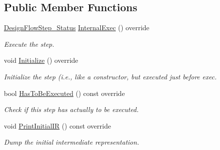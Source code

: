 \subsection*{Public Member Functions}
\begin{DoxyCompactItemize}
\item 
\hyperlink{design__flow__step_8hpp_afb1f0d73069c26076b8d31dbc8ebecdf}{Design\+Flow\+Step\+\_\+\+Status} \hyperlink{classallocation_a4bb8fddc280745e60af6840eec09d4ca}{Internal\+Exec} () override
\begin{DoxyCompactList}\small\item\em Execute the step. \end{DoxyCompactList}\item 
void \hyperlink{classallocation_a448e4e0cc7e3444fb3479f211d0b637e}{Initialize} () override
\begin{DoxyCompactList}\small\item\em Initialize the step (i.\+e., like a constructor, but executed just before exec. \end{DoxyCompactList}\item 
bool \hyperlink{classallocation_af29b72851d7c54b1b6ea0b60daa162de}{Has\+To\+Be\+Executed} () const override
\begin{DoxyCompactList}\small\item\em Check if this step has actually to be executed. \end{DoxyCompactList}\item 
void \hyperlink{classallocation_aa977c26d2952e7fc0e7f09037c540bd3}{Print\+Initial\+IR} () const override
\begin{DoxyCompactList}\small\item\em Dump the initial intermediate representation. \end{DoxyCompactList}\end{DoxyCompactItemize}
